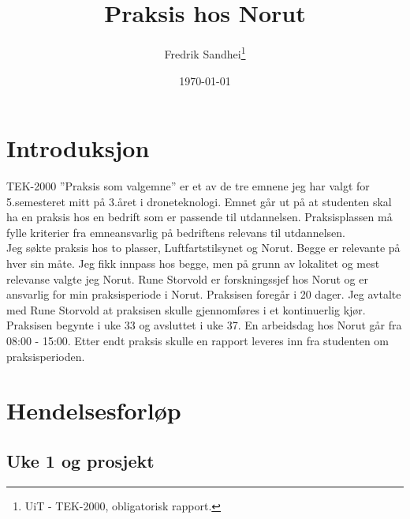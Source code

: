 \documentclass[12pt, a4paper]{report}
\begin{document}
\title{\\Praksis hos Norut}
\author{Fredrik Sandhei\thanks{UiT - TEK-2000, obligatorisk rapport.}}

\date{\today}
\maketitle
\newpage
\tableofcontents
\newpage

\section{Introduksjon}
TEK-2000 ''Praksis som valgemne'' er et av de tre emnene jeg har valgt for 5.semesteret mitt på 3.året i droneteknologi. Emnet går ut på at studenten skal ha en praksis hos en bedrift som er passende til utdannelsen. Praksisplassen må fylle kriterier fra emneansvarlig på bedriftens relevans til utdannelsen. \\
Jeg søkte praksis hos to plasser, Luftfartstilsynet og Norut. Begge er relevante på hver sin måte. Jeg fikk innpass hos begge, men på grunn av lokalitet og mest relevanse valgte jeg Norut. Rune Storvold er forskningssjef hos Norut og er ansvarlig for min praksisperiode i Norut. Praksisen foregår i 20 dager. Jeg avtalte med Rune Storvold at praksisen skulle gjennomføres i et kontinuerlig kjør. Praksisen begynte i uke 33 og avsluttet i uke 37. En arbeidsdag hos Norut går fra 08:00 - 15:00. Etter endt praksis skulle en rapport leveres inn fra studenten om praksisperioden. 

\newpage
\section{Hendelsesforløp}
\subsection{Uke 1 og prosjekt}
\end{document}

